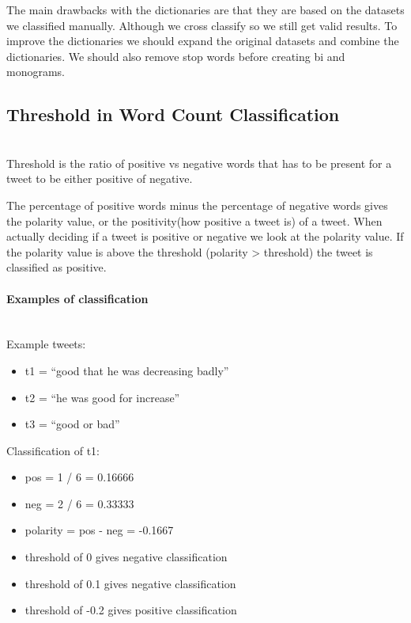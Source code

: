 The main drawbacks with the dictionaries are that they are based on the
datasets we classified manually. Although we cross classify so we still get
valid results. To improve the dictionaries we should expand the original
datasets and combine the dictionaries. We should also remove stop words before
creating bi and monograms.

\subsection{Threshold in Word Count Classification}\label{sentiment:threshold} 
\hspace{0pt}\\ 
Threshold is the ratio of positive vs negative words that has to be present for a
tweet to be either positive of negative.

The percentage of positive words minus the percentage of negative words gives
the polarity value, or the positivity(how positive a tweet is) of a tweet. 
When actually deciding if a tweet is positive or negative we look at the
polarity value. If the polarity value is above the threshold (polarity >
threshold) the tweet is classified as positive. 

\paragraph{Examples of classification} 
\hspace{0pt}\\ 
Example tweets:
\begin{itemize}
    \item t1 = “good that he was decreasing badly”
    \item t2 = “he was good for increase” 
    \item t3 = “good or bad”
\end{itemize}

Classification of t1:
\begin{itemize}
    \item pos = 1 / 6 = 0.16666
    \item neg = 2 / 6 = 0.33333
    \item polarity = pos - neg = -0.1667
    \item threshold of 0 gives negative classification
    \item threshold of 0.1 gives negative classification
    \item threshold of -0.2 gives positive classification
\end{itemize}

